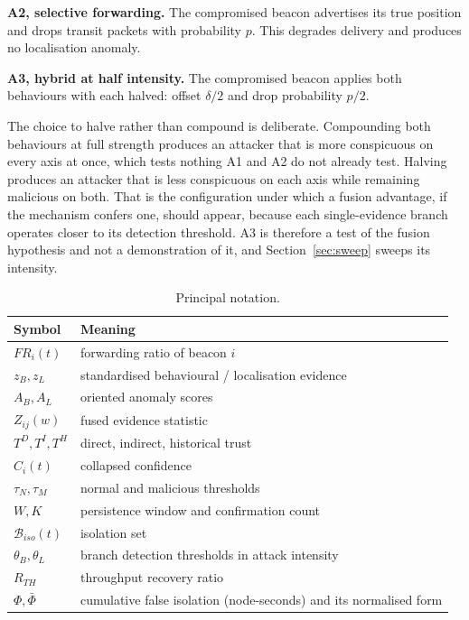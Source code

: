 \textbf{A2, selective forwarding.} The compromised beacon advertises its true
position and drops transit packets with probability $p$. This degrades
delivery and produces no localisation anomaly.

\textbf{A3, hybrid at half intensity.} The compromised beacon applies both
behaviours with each halved: offset $\delta/2$ and drop probability $p/2$.

The choice to halve rather than compound is deliberate. Compounding both
behaviours at full strength produces an attacker that is more conspicuous on
every axis at once, which tests nothing A1 and A2 do not already test.
Halving produces an attacker that is less conspicuous on each axis while
remaining malicious on both. That is the configuration under which a fusion
advantage, if the mechanism confers one, should appear, because each
single-evidence branch operates closer to its detection threshold. A3 is
therefore a test of the fusion hypothesis and not a demonstration of it,
and Section~\ref{sec:sweep} sweeps its intensity.

\begin{table}[!t]
\caption{Principal notation.}
\label{tab:notation}
\centering
\footnotesize
\begin{tabular}{@{}ll@{}}
\toprule
Symbol & Meaning \\
\midrule
$FR_i(t)$ & forwarding ratio of beacon $i$ \\
$z_B, z_L$ & standardised behavioural / localisation evidence \\
$A_B, A_L$ & oriented anomaly scores \\
$Z_{ij}(w)$ & fused evidence statistic \\
$T^D, T^I, T^H$ & direct, indirect, historical trust \\
$\hat C_i(t)$ & collapsed confidence \\
$\tau_N, \tau_M$ & normal and malicious thresholds \\
$W, K$ & persistence window and confirmation count \\
$\mathcal{B}_{iso}(t)$ & isolation set \\
$\theta_B, \theta_L$ & branch detection thresholds in attack intensity \\
$R_{TH}$ & throughput recovery ratio \\
$\Phi, \bar\Phi$ & cumulative false isolation (node-seconds) and its normalised form \\
\bottomrule
\end{tabular}
\end{table}
